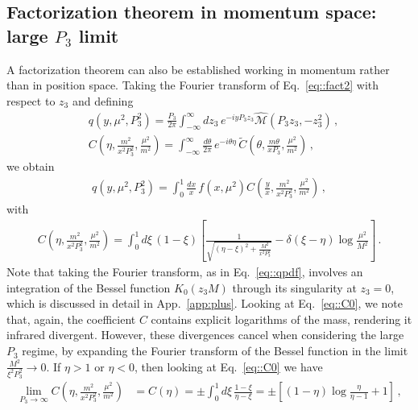 \subsection{Factorization theorem in momentum space: large $P_3$ limit}
\label{sec::momentumspace}

A factorization theorem can also be established working in momentum rather than
in position space. Taking the Fourier transform of Eq.~\eqref{eq::fact2} with
respect to $z_3$ and defining
\begin{align}
	\label{eq::qpdf}
	&q\left(y, \mu^2, P_3^2\right) = 
	\frac{P_3}{2\pi} 
	\int_{-\infty}^{\infty}dz_3\, e^{-i y P_3 z_3} 
	\widehat{\mathcal{M}}\left(P_3 z_3, -z_3^2\right)\, , \\
	\label{eq::matching0}
	&C\left(\eta,\frac{m^2}{x^2 P_3^2}, \frac{\mu^2}{m^2}\right) = 
	\int_{-\infty}^{\infty}\frac{d\theta}{2\pi}\, e^{-i\theta\eta}\,
	\tilde{C}\left(\theta, \frac{m\theta}{x P_3}, \frac{\mu^2}{m^2} \right)\, ,
\end{align}
we obtain
\begin{align}
	\label{eq::matching1}
	q\left(y, \mu^2, P_3^2\right) = 
	\int_{0}^{1} \frac{d x}{x}\, f\left(x,\mu^2\right) 
	C\left(\frac{y}{x},\frac{m^2}{x^2 P_3^2}, \frac{\mu^2}{m^2}\right)\, ,
\end{align}
with
\begin{align}
	\label{eq::C0}
	C\left(\eta,\frac{m^2}{x^2 P_3^2}, \frac{\mu^2}{m^2}\right) = 
	\int_0^1 d\xi \, \left(1-\xi\right) 
	\left[\frac{1}{\sqrt{\left(\eta-\xi\right)^2
	 + \frac{M^2}{x^2P_3^2}}} - 
	 \delta\left(\xi-\eta\right) \log\frac{\mu^2}{M^2}\right]\, .
\end{align}
Note that taking the Fourier transform, as in Eq.~\eqref{eq::qpdf}, involves an
integration of the Bessel function $K_0\left(z_3 M\right)$ through its
singularity at $z_3=0$, which is discussed in detail in App.~\ref{app:plus}.
Looking at Eq.~\eqref{eq::C0}, we note that, again, the coefficient $C$ contains
explicit logarithms of the mass, rendering it infrared divergent. However, these
divergences cancel when considering the large $P_3$ regime, by expanding the
Fourier transform of the Bessel function in the limit
$\frac{M^2}{\xi^2P_3^2}\rightarrow 0$. If $\eta>1$ or $\eta<0$, then looking at
Eq.~\eqref{eq::C0} we have 
\begin{align}
	\lim_{P_3\rightarrow \infty} 
	C\left(\eta,\frac{m^2}{x^2 P_3^2}, \frac{\mu^2}{m^2}\right) &= 
	C\left(\eta\right) = 
	\pm \int_0^1 d\xi \,\frac{1-\xi}{\eta-\xi} = 
	\pm \left[\left(1-\eta\right) \log\frac{\eta}{\eta-1} + 1 \right]\, ,
\end{align}
